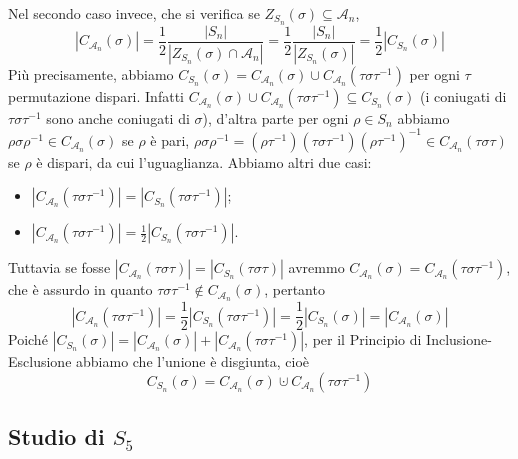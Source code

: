 \documentclass[11pt]{scrartcl}
\begin{document}
Nel secondo caso invece, che si verifica se $Z_{S_n}(\sigma)\subseteq 
\mathcal{A}_n$,
\[
    |C_{\mathcal{A}_n}(\sigma)| = \frac 1 2 \frac{|S_n|}{|Z_{S_n}(\sigma)\cap\mathcal{A}_n|}
    = \frac 1 2 \frac{|S_n|}{|Z_{S_n}(\sigma)|} = \frac 1 2 |C_{S_n}(\sigma)|
\]
Più precisamente, abbiamo $C_{S_n}(\sigma) = C_{\mathcal{A}_n}(\sigma) \cup
C_{\mathcal{A}_n}(\tau\sigma\tau^{-1})$ per ogni $\tau$ permutazione dispari. 
Infatti $C_{\mathcal{A}_n}(\sigma) \cup C_{\mathcal{A}_n}(\tau\sigma\tau^{-1})
\subseteq C_{S_n}(\sigma)$ (i coniugati di $\tau\sigma\tau^{-1}$ sono anche
coniugati di $\sigma$), d'altra parte per ogni $\rho \in S_n$ abbiamo
$\rho\sigma\rho^{-1} \in C_{\mathcal{A}_n}(\sigma)$ se $\rho$ è pari,
$\rho\sigma\rho^{-1} = (\rho\tau^{-1})(\tau\sigma\tau^{-1})(\rho\tau^{-1})^{-1}
\in C_{\mathcal{A}_n}(\tau\sigma\tau)$ se $\rho$ è dispari, da cui l'uguaglianza.
Abbiamo altri due casi:
\begin{itemize}
    \item $|C_{\mathcal{A}_n}(\tau\sigma\tau^{-1})| = |C_{S_n}(\tau\sigma\tau^{-1})|$;
    \item $|C_{\mathcal{A}_n}(\tau\sigma\tau^{-1})| = \displaystyle\frac 1 2
    |C_{S_n}(\tau\sigma\tau^{-1})|$.
\end{itemize}
Tuttavia se fosse $|C_{\mathcal{A}_n}(\tau\sigma\tau)| = |C_{S_n}(\tau\sigma\tau)|$
avremmo $C_{\mathcal{A}_n}(\sigma) = C_{\mathcal{A}_n}(\tau\sigma\tau^{-1})$,
che è assurdo in quanto $\tau\sigma\tau^{-1} \notin C_{\mathcal{A}_n}(\sigma)$,
pertanto \[
    |C_{\mathcal{A}_n}(\tau\sigma\tau^{-1})| = \displaystyle\frac 1 2
    |C_{S_n}(\tau\sigma\tau^{-1})| = \frac 1 2|C_{S_n}(\sigma)| =
    |C_{\mathcal{A}_n}(\sigma)|
\]
Poiché 
$|C_{S_n}(\sigma)| = |C_{\mathcal{A}_n}(\sigma)| + |C_{\mathcal{A}_n}(\tau\sigma\tau^{-1})|$,
per il Principio di Inclusione-Esclusione abbiamo che l'unione è disgiunta,
cioè
\[
    C_{S_n}(\sigma) = C_{\mathcal{A}_n}(\sigma) \cupdot C_{\mathcal{A}_n}(\tau\sigma\tau^{-1})
\]

\subsection{Studio di $S_5$}
\end{document}
